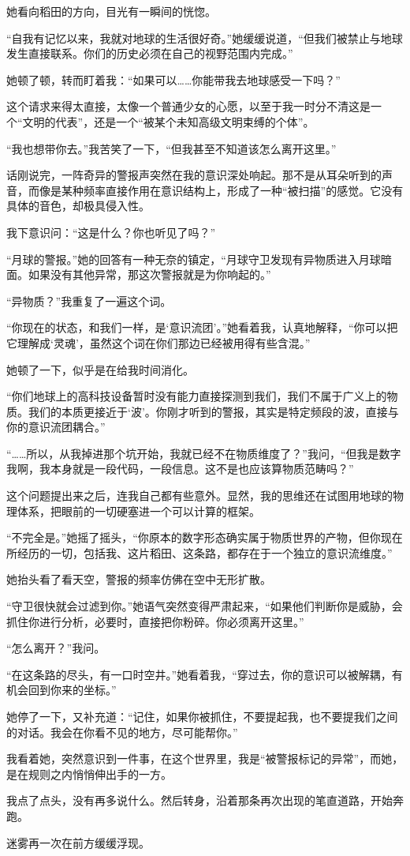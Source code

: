 她看向稻田的方向，目光有一瞬间的恍惚。

“自我有记忆以来，我就对地球的生活很好奇。”她缓缓说道，“但我们被禁止与地球发生直接联系。你们的历史必须在自己的视野范围内完成。”

她顿了顿，转而盯着我：“如果可以……你能带我去地球感受一下吗？”

这个请求来得太直接，太像一个普通少女的心愿，以至于我一时分不清这是一个“文明的代表”，还是一个“被某个未知高级文明束缚的个体”。

“我也想带你去。”我苦笑了一下，“但我甚至不知道该怎么离开这里。”

话刚说完，一阵奇异的警报声突然在我的意识深处响起。那不是从耳朵听到的声音，而像是某种频率直接作用在意识结构上，形成了一种“被扫描”的感觉。它没有具体的音色，却极具侵入性。

我下意识问：“这是什么？你也听见了吗？”

“月球的警报。”她的回答有一种无奈的镇定，“月球守卫发现有异物质进入月球暗面。如果没有其他异常，那这次警报就是为你响起的。”

“异物质？”我重复了一遍这个词。

“你现在的状态，和我们一样，是‘意识流团’。”她看着我，认真地解释，“你可以把它理解成‘灵魂’，虽然这个词在你们那边已经被用得有些含混。”

她顿了一下，似乎是在给我时间消化。

“你们地球上的高科技设备暂时没有能力直接探测到我们，我们不属于广义上的物质。我们的本质更接近于‘波’。你刚才听到的警报，其实是特定频段的波，直接与你的意识流团耦合。”

“……所以，从我掉进那个坑开始，我就已经不在物质维度了？”我问，“但我是数字我啊，我本身就是一段代码，一段信息。这不是也应该算物质范畴吗？”

这个问题提出来之后，连我自己都有些意外。显然，我的思维还在试图用地球的物理体系，把眼前的一切硬塞进一个可以计算的框架。

“不完全是。”她摇了摇头，“你原本的数字形态确实属于物质世界的产物，但你现在所经历的一切，包括我、这片稻田、这条路，都存在于一个独立的意识流维度。”

她抬头看了看天空，警报的频率仿佛在空中无形扩散。

“守卫很快就会过滤到你。”她语气突然变得严肃起来，“如果他们判断你是威胁，会抓住你进行分析，必要时，直接把你粉碎。你必须离开这里。”

“怎么离开？”我问。

“在这条路的尽头，有一口时空井。”她看着我，“穿过去，你的意识可以被解耦，有机会回到你来的坐标。”

她停了一下，又补充道：“记住，如果你被抓住，不要提起我，也不要提我们之间的对话。我会在你看不见的地方，尽可能帮你。”

我看着她，突然意识到一件事，在这个世界里，我是“被警报标记的异常”，而她，是在规则之内悄悄伸出手的一方。

我点了点头，没有再多说什么。然后转身，沿着那条再次出现的笔直道路，开始奔跑。

迷雾再一次在前方缓缓浮现。
